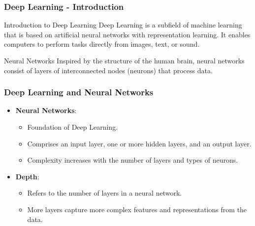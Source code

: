 \documentclass[aspectratio=169]{beamer}
\begin{document}
\begin{frame}
    \frametitle{Deep Learning - Introduction}
    \begin{block}{Introduction to Deep Learning}
        Deep Learning is a subfield of machine learning that is based on artificial neural networks with representation learning. It enables computers to perform tasks directly from images, text, or sound.
    \end{block}
    
    \begin{block}{Neural Networks}
        Inspired by the structure of the human brain, neural networks consist of layers of interconnected nodes (neurons) that process data.
    \end{block}
\end{frame}

\begin{frame}
    \frametitle{Deep Learning and Neural Networks}
    \begin{itemize}
        \item \textbf{Neural Networks}:
        \begin{itemize}
            \item Foundation of Deep Learning.
            \item Comprises an input layer, one or more hidden layers, and an output layer.
            \item Complexity increases with the number of layers and types of neurons.
        \end{itemize}
        \item \textbf{Depth}:
        \begin{itemize}
            \item Refers to the number of layers in a neural network.
            \item More layers capture more complex features and representations from the data.
        \end{itemize}
    \end{itemize}
\end{frame}
\end{document}
